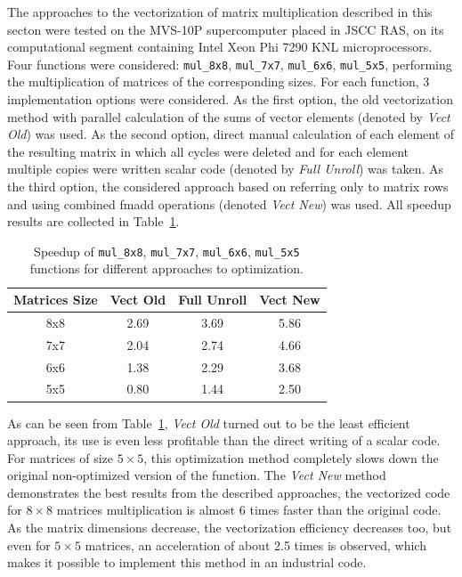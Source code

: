 \documentclass[
11pt,%
tightenlines,%
twoside,%
onecolumn,%
nofloats,%
nobibnotes,%
nofootinbib,%
superscriptaddress,%
noshowpacs,%
centertags]%
{revtex4}
\begin{document}
The approaches to the vectorization of matrix multiplication described in this secton were tested on the MVS-10P supercomputer placed in JSCC RAS, on its computational segment containing Intel Xeon Phi 7290 KNL microprocessors.
Four functions were considered: \texttt{mul\_8x8}, \texttt{mul\_7x7}, \texttt{mul\_6x6}, \texttt{mul\_5x5}, performing the multiplication of matrices of the corresponding sizes.
For each function, 3 implementation options were considered.
As the first option, the old vectorization method with parallel calculation of the sums of vector elements (denoted by \textit{Vect Old}) was used.
As the second option, direct manual calculation of each element of the resulting matrix in which all cycles were deleted and for each element multiple copies were written scalar code (denoted by \textit{Full Unroll}) was taken.
As the third option, the considered approach based on referring only to matrix rows and using combined fmadd operations (denoted \textit{Vect New}) was used.
All speedup results are collected in Table~\ref{tab:mul_speedup}.

\begin{table}[!h]
\setcaptionmargin{0mm}
\onelinecaptionsfalse
{}
\caption{Speedup of \texttt{mul\_8x8}, \texttt{mul\_7x7}, \texttt{mul\_6x6}, \texttt{mul\_5x5} functions for different approaches to optimization.}
\bigskip
\begin{tabular}{|c|c|c|c|}
\hline
\textbf{Matrices Size} & \textbf{Vect Old} & \textbf{Full Unroll} & \textbf{Vect New} \\
\hline
8x8 & 2.69 & 3.69 & 5.86 \\
7x7 & 2.04 & 2.74 & 4.66 \\
6x6 & 1.38 & 2.29 & 3.68 \\
5x5 & 0.80 & 1.44 & 2.50 \\
\hline
\end{tabular}
\label{tab:mul_speedup}
\end{table}

As can be seen from Table~\ref{tab:mul_speedup}, \textit{Vect Old} turned out to be the least efficient approach, its use is even less profitable than the direct writing of a scalar code.
For matrices of size $5 \times 5$, this optimization method completely slows down the original non-optimized version of the function.
The \textit{Vect New} method demonstrates the best results from the described approaches, the vectorized code for $8 \times 8$ matrices multiplication is almost 6 times faster than the original code.
As the matrix dimensions decrease, the vectorization efficiency decreases too, but even for $5 \times 5$ matrices, an acceleration of about 2.5 times is observed, which makes it possible to implement this method in an industrial code.
\end{document}
